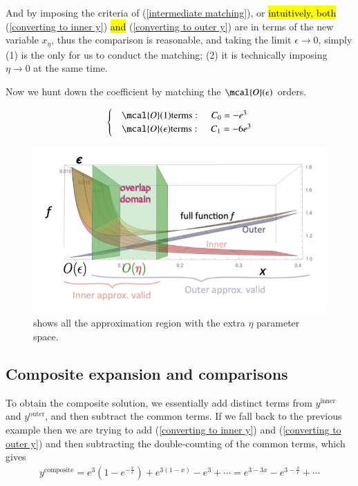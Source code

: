 \documentclass[a4paper, 12pt]{article}
\begin{document}
And by imposing the criteria of (\ref{intermediate matching}), or
\hl{intuitively, both } (\ref{converting to inner y}) \hl{and
} (\ref{converting to outer y}) are in terms of the new variable \( x_{\eta}
\), thus the comparison is reasonable, and taking the limit \( \epsilon \to
0 \), simply (1) is the only for us to conduct the matching; (2) 
it is technically imposing \( \eta \to 0 \) at the same time.

Now we hunt down the coefficient by matching the \( \mcal{O}(\epsilon) \)
orders. 

\begin{align}
  \label{matching gives}
  \begin{cases} 
    &\mcal{O}(1) \mathrm{ terms:  } \hspace{0.5cm} C_0 = -e^3 \\
    &\mcal{O}(\epsilon) \mathrm{ terms: } \hspace{0.5cm} C_1 = -6e^3
  \end{cases}
\end{align}



\begin{figure}[h!]
\begin{center}
  \includegraphics[scale=0.5]{Figures/mixasymp.png}
\end{center}
\caption{shows all the approximation region with the extra \( \eta \)
  parameter space.}
\label{fig:mixasmpy}
\end{figure}

\subsection{Composite expansion and comparisons}%
  \label{sub:Composite expansion and comparisons}
  To obtain the composite solution, we essentially add distinct terms from
  \( y^{\mathrm{inner}}  \) and \( y^{\mathrm{outer}}  \), and then
  subtract the common terms. 
  If we fall back to the previous example then we are trying to add
  (\ref{converting to inner y}) and (\ref{converting to outer y}) and then
  subtracting the double-counting of the common terms, which gives 
  \begin{align}
    \label{composite y}
    y^{\mathrm{composite}} = e^{3}(1 - e^{-\frac{x}{\epsilon}}) +
    e^{3(1-x)} - e^{3} + \cdots = e^{3 - 3x} - e^{3 -
    \frac{x}{\epsilon}} + \cdots    
  \end{align}
\end{document}
